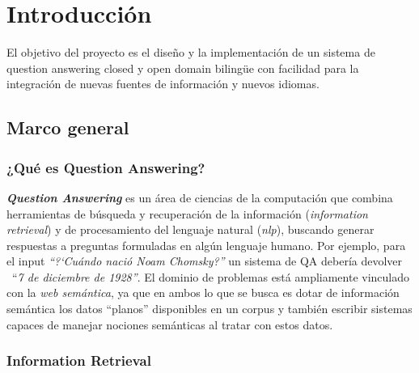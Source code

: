 \chapter{Introducción}
El objetivo del proyecto es el diseño y la implementación de un sistema de question answering closed y open domain bilingüe con facilidad para la integración de nuevas fuentes de información y nuevos idiomas.
\section{Marco general}
\subsection{¿Qué es Question Answering?}

\textbf{\textit{Question Answering }}es un \'area de ciencias de la
computaci\'on que combina herramientas de b\'usqueda y recuperaci\'on
de la informaci\'on (\textit{information retrieval}) y de procesamiento del lenguaje natural (\textit{nlp}), buscando
generar respuestas a preguntas formuladas en alg\'un lenguaje humano.
Por ejemplo, para el input \textit{{\textquotedblleft}?`Cu\'ando
naci\'o Noam Chomsky?{\textquotedblright}} un sistema de QA deber\'ia
devolver \ {\textquotedblleft}\textit{7 de diciembre de
1928{\textquotedblright}}. El dominio de problemas est\'a ampliamente
vinculado con la \textit{web sem\'antica}, ya que en ambos lo que se busca es dotar de
informaci\'on sem\'antica los datos
{\textquotedblleft}planos{\textquotedblright} disponibles en un corpus y
tambi\'en escribir sistemas capaces de manejar nociones sem\'anticas al
tratar con estos datos. 


\subsection{Information Retrieval}

